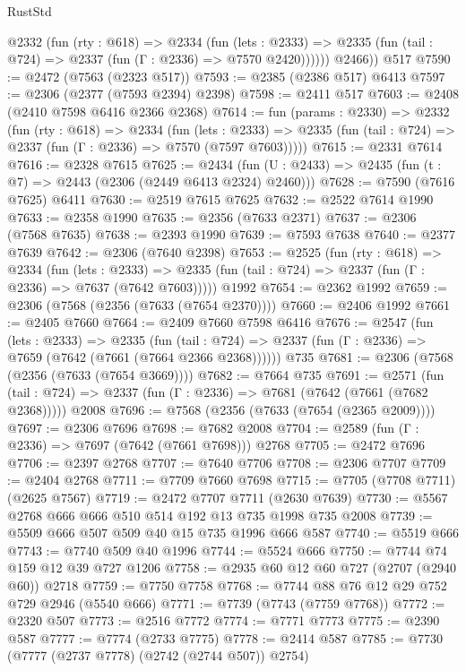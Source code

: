 \begin{lexlean}{RustStd}
\begin{coremodule}
          @2332
            (fun (rty : @618) =>
            @2334
              (fun (lets : @2333) =>
              @2335 (fun (tail : @724) => @2337 (fun (Γ : @2336) => @7570 @2420))))))
        @2466))
    @517
@7590 := @2472 (@7563 (@2323 @517))
@7593 := @2385 (@2386 @517) @6413
@7597 := @2306 (@2377 (@7593 @2394) @2398)
@7598 := @2411 @517
@7603 := @2408 (@2410 @7598 @6416 @2366 @2368)
@7614 := fun (params : @2330) =>
  @2332
    (fun (rty : @618) =>
    @2334
      (fun (lets : @2333) =>
      @2335 (fun (tail : @724) => @2337 (fun (Γ : @2336) => @7570 (@7597 @7603)))))
@7615 := @2331 @7614
@7616 := @2328 @7615
@7625 := @2434 (fun (U : @2433) => @2435 (fun (t : @7) => @2443 (@2306 (@2449 @6413 @2324) @2460)))
@7628 := @7590 (@7616 @7625) @6411
@7630 := @2519 @7615 @7625
@7632 := @2522 @7614 @1990
@7633 := @2358 @1990
@7635 := @2356 (@7633 @2371)
@7637 := @2306 (@7568 @7635)
@7638 := @2393 @1990
@7639 := @7593 @7638
@7640 := @2377 @7639
@7642 := @2306 (@7640 @2398)
@7653 := @2525
    (fun (rty : @618) =>
    @2334
      (fun (lets : @2333) =>
      @2335 (fun (tail : @724) => @2337 (fun (Γ : @2336) => @7637 (@7642 @7603)))))
    @1992
@7654 := @2362 @1992
@7659 := @2306 (@7568 (@2356 (@7633 (@7654 @2370))))
@7660 := @2406 @1992
@7661 := @2405 @7660
@7664 := @2409 @7660 @7598 @6416
@7676 := @2547
    (fun (lets : @2333) =>
    @2335
      (fun (tail : @724) => @2337 (fun (Γ : @2336) => @7659 (@7642 (@7661 (@7664 @2366 @2368))))))
    @735
@7681 := @2306 (@7568 (@2356 (@7633 (@7654 @3669))))
@7682 := @7664 @735
@7691 := @2571
    (fun (tail : @724) => @2337 (fun (Γ : @2336) => @7681 (@7642 (@7661 (@7682 @2368)))))
    @2008
@7696 := @7568 (@2356 (@7633 (@7654 (@2365 @2009))))
@7697 := @2306 @7696
@7698 := @7682 @2008
@7704 := @2589 (fun (Γ : @2336) => @7697 (@7642 (@7661 @7698))) @2768
@7705 := @2472 @7696
@7706 := @2397 @2768
@7707 := @7640 @7706
@7708 := @2306 @7707
@7709 := @2404 @2768
@7711 := @7709 @7660 @7698
@7715 := @7705 (@7708 @7711) (@2625 @7567)
@7719 := @2472 @7707 @7711 (@2630 @7639)
@7730 := @5567 @2768 @666 @666 @510 @514 @192 @13 @735 @1998 @735 @2008
@7739 := @5509 @666 @507 @509 @40 @15 @735 @1996 @666 @587
@7740 := @5519 @666
@7743 := @7740 @509 @40 @1996
@7744 := @5524 @666
@7750 := @7744 @74 @159 @12 @39 @727 @1206
@7758 := @2935 @60 @12 @60 @727 (@2707 (@2940 @60)) @2718
@7759 := @7750 @7758
@7768 := @7744 @88 @76 @12 @29 @752 @729 @2946 (@5540 @666)
@7771 := @7739 (@7743 (@7759 @7768))
@7772 := @2320 @507
@7773 := @2516 @7772
@7774 := @7771 @7773
@7775 := @2390 @587
@7777 := @7774 (@2733 @7775)
@7778 := @2414 @587
@7785 := @7730 (@7777 (@2737 @7778) (@2742 (@2744 @507)) @2754)

\end{coremodule}
\end{lexlean}
